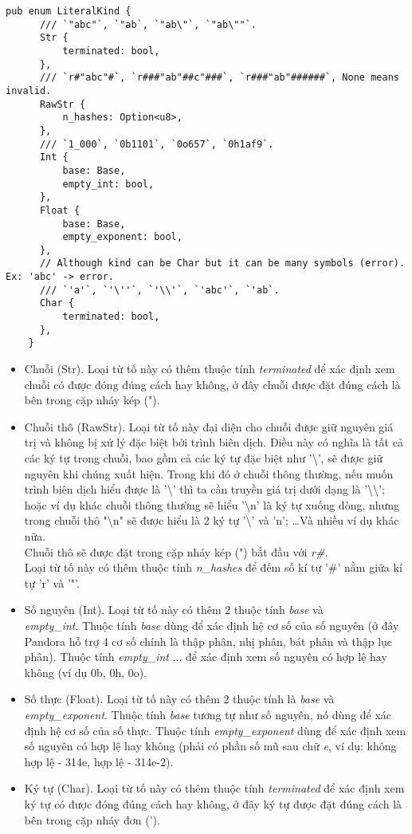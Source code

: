 \begin{itemize}
    \begin{lstlisting}[]
    pub enum LiteralKind {
      /// `"abc"`, `"ab`, `"ab\"`, `"ab\""`.
      Str {
          terminated: bool,
      },
      /// `r#"abc"#`, `r###"ab"##c"###`, `r###"ab"######`, None means invalid.
      RawStr {
          n_hashes: Option<u8>,
      },
      /// `1_000`, `0b1101`, `0o657`, `0h1af9`.
      Int {
          base: Base,
          empty_int: bool,
      },
      Float {
          base: Base,
          empty_exponent: bool,
      },
      // Although kind can be Char but it can be many symbols (error). Ex: 'abc' -> error.
      /// `'a'`, `'\''`, `'\\'`, `'abc'`, `'ab`.
      Char {
          terminated: bool,
      },
    }
    \end{lstlisting}
    \begin{itemize}
      \item Chuỗi (Str). Loại từ tố này có thêm thuộc tính \textit{terminated} để xác định xem chuỗi có được đóng đúng cách hay không, ở đây chuỗi được đặt đúng cách là bên trong cặp nháy kép (").
      \item Chuỗi thô (RawStr). Loại từ tố này đại diện cho chuỗi được giữ nguyên giá trị và không bị xử lý đặc biệt bởi trình biên dịch. Điều này có nghĩa là tất cả các ký tự trong chuỗi, bao gồm cả các ký tự đặc biệt như '\textbackslash', sẽ được giữ nguyên khi chúng xuất hiện. Trong khi đó ở chuỗi thông thường, nếu muốn trình biên dịch hiểu được là '\textbackslash' thì ta cần truyền giá trị dưới dạng là '\textbackslash\textbackslash'; hoặc ví dụ khác chuỗi thông thường sẽ hiểu '\textbackslash n' là ký tự xuống dòng, nhưng trong chuỗi thô "\textbackslash n" sẽ được hiểu là 2 ký tự '\textbackslash' và 'n'; \dots\space Và nhiều ví dụ khác nữa. 
      \\Chuỗi thô sẽ được đặt trong cặp nháy kép (") bắt đầu với \textit{r\#}.
      \\Loại từ tố này có thêm thuộc tính \textit{n\_hashes} để đếm số kí tự '\#' nằm giữa kí tự 'r' và '"'.
      \item Số nguyên (Int). Loại từ tố này có thêm 2 thuộc tính \textit{base} và \\\textit{empty\_int}. Thuộc tính \textit{base} dùng để xác định hệ cơ số của số nguyên (ở đây Pandora hỗ trợ 4 cơ số chính là thập phân, nhị phân, bát phân và thập lục phân). Thuộc tính \textit{empty\_int} ... để xác định xem số nguyên có hợp lệ hay không (ví dụ 0b, 0h, 0o).
      \item Số thực (Float). Loại từ tố này có thêm 2 thuộc tính là \textit{base} và \\\textit{empty\_exponent}. Thuộc tính \textit{base} tương tự như số nguyên, nó dùng để xác định hệ cơ số của số thực. Thuộc tính \textit{empty\_exponent} dùng để xác định xem số nguyên có hợp lệ hay không (phải có phần số mũ sau chữ \textit{e}, ví dụ: không hợp lệ - 314e, hợp lệ - 314e-2).
      \item Ký tự (Char). Loại từ tố này có thêm thuộc tính \textit{terminated} để xác định xem ký tự có được đóng đúng cách hay không, ở đây ký tự được đặt đúng cách là bên trong cặp nháy đơn (').
      

\end{itemize}
\end{itemize}
